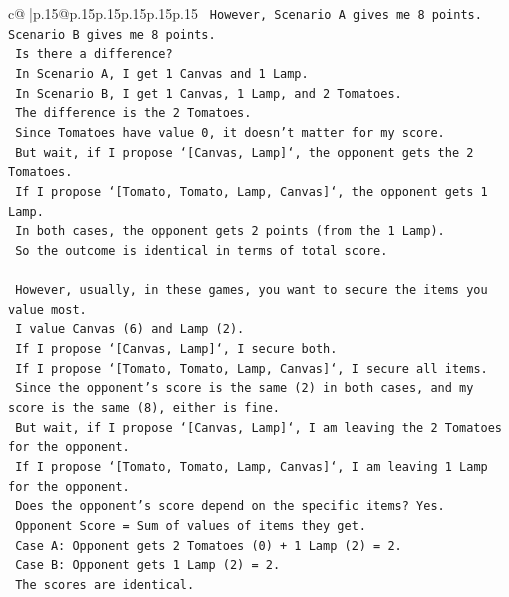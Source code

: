 \documentclass{article}
\begin{document}
{\begin{supertabular}{c@{$\;$}|p{.15\linewidth}@{}p{.15\linewidth}p{.15\linewidth}p{.15\linewidth}p{.15\linewidth}p{.15\linewidth}}
{{{\texttt{    However, Scenario A gives me 8 points. Scenario B gives me 8 points.} \\
\texttt{    Is there a difference?} \\
\texttt{    In Scenario A, I get 1 Canvas and 1 Lamp.} \\
\texttt{    In Scenario B, I get 1 Canvas, 1 Lamp, and 2 Tomatoes.} \\
\texttt{    The difference is the 2 Tomatoes.} \\
\texttt{    Since Tomatoes have value 0, it doesn't matter for my score.} \\
\texttt{    But wait, if I propose `{[}Canvas, Lamp{]}`, the opponent gets the 2 Tomatoes.} \\
\texttt{    If I propose `{[}Tomato, Tomato, Lamp, Canvas{]}`, the opponent gets 1 Lamp.} \\
\texttt{    In both cases, the opponent gets 2 points (from the 1 Lamp).} \\
\texttt{    So the outcome is identical in terms of total score.} \\
\\ 
\texttt{    However, usually, in these games, you want to secure the items you value most.} \\
\texttt{    I value Canvas (6) and Lamp (2).} \\
\texttt{    If I propose `{[}Canvas, Lamp{]}`, I secure both.} \\
\texttt{    If I propose `{[}Tomato, Tomato, Lamp, Canvas{]}`, I secure all items.} \\
\texttt{    Since the opponent's score is the same (2) in both cases, and my score is the same (8), either is fine.} \\
\texttt{    But wait, if I propose `{[}Canvas, Lamp{]}`, I am leaving the 2 Tomatoes for the opponent.} \\
\texttt{    If I propose `{[}Tomato, Tomato, Lamp, Canvas{]}`, I am leaving 1 Lamp for the opponent.} \\
\texttt{    Does the opponent's score depend on the specific items? Yes.} \\
\texttt{    Opponent Score = Sum of values of items they get.} \\
\texttt{    Case A: Opponent gets 2 Tomatoes (0) + 1 Lamp (2) = 2.} \\
\texttt{    Case B: Opponent gets 1 Lamp (2) = 2.} \\
\texttt{    The scores are identical.} \\
\\ 
}}}
\end{supertabular}}
\end{document}
